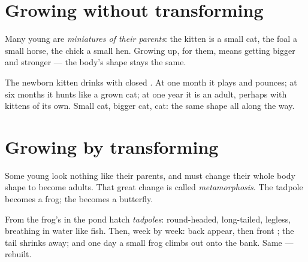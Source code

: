 \section{Growing without transforming}

\begin{definition}\label{def:g2:animals-grow-up:direct}
Many young  are \emph{miniatures of their
parents}: the kitten is a small
cat, the foal a small horse, the chick a small hen. Growing up,
for them, means getting bigger and stronger --- the body's shape
stays the same.
\end{definition}

\begin{example}\label{ex:g2:animals-grow-up:kitten}
The newborn kitten drinks  with closed . At one month it
plays and pounces; at six months it hunts like a grown cat; at one
year it is an adult, perhaps with kittens of its own. Small cat,
bigger cat, cat: the same shape all along the way.
\end{example}

\section{Growing by transforming}

\begin{definition}[Metamorphosis]\label{def:g2:animals-grow-up:metamorphosis}
Some young  look nothing like their parents, and must
change their whole body shape to become adults. That great change
is called \emph{metamorphosis}. The tadpole
becomes a frog; the  becomes a butterfly.
\end{definition}

\begin{example}\label{ex:g2:animals-grow-up:frog}
From the frog's  in the pond hatch \emph{tadpoles}:
round-headed, long-tailed, legless, breathing in water like fish.
Then, week by week: back  appear, then front ; the tail
shrinks away; and one day a small frog climbs out onto the bank.
Same  --- rebuilt.
\end{example}

